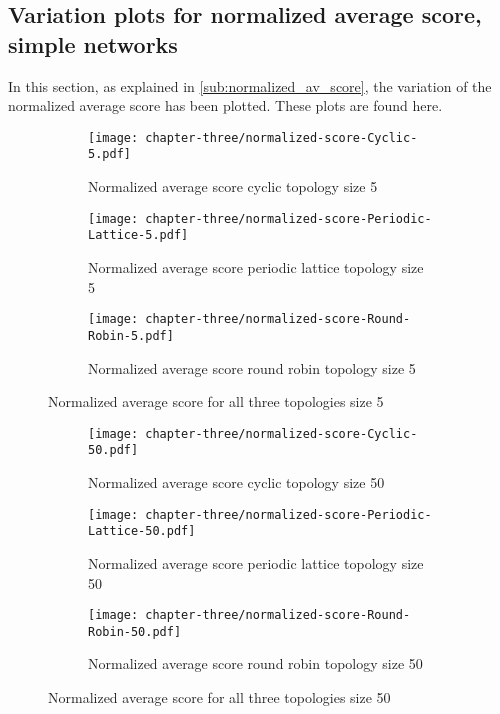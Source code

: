\subsection{Variation plots for normalized average score, simple networks}
\label{append:variation-plots}
In this section, as explained in \autoref{sub:normalized_av_score}, the variation of the
normalized average score has been plotted. These plots are found here.

\begin{figure}[H]
	\centering
	\begin{subfigure}[t]{0.75\textwidth}
		\centering
		\texttt{[image: chapter-three/normalized-score-Cyclic-5.pdf]}
		\caption{Normalized average score cyclic topology size 5}
	\end{subfigure}
	\hfill
	\begin{subfigure}[t]{0.75\textwidth}\centering
		\centering
		\texttt{[image: chapter-three/normalized-score-Periodic-Lattice-5.pdf]}
		\caption{Normalized average score periodic lattice topology size 5}
	\end{subfigure}
	\hfill
	\begin{subfigure}[t]{0.75\textwidth}\centering
		\centering
		\texttt{[image: chapter-three/normalized-score-Round-Robin-5.pdf]}
		\caption{Normalized average score round robin topology size 5}
	\end{subfigure}
	\caption{Normalized average score for all three topologies size 5}
	\label{fig:average-score-five}
\end{figure}

\begin{figure}[H]
	\centering
	\begin{subfigure}[t]{0.75\textwidth}
		\centering
		\texttt{[image: chapter-three/normalized-score-Cyclic-50.pdf]}
		\caption{Normalized average score cyclic topology size 50}
	\end{subfigure}
	\hfill
	\begin{subfigure}[t]{0.75\textwidth}\centering
		\centering
		\texttt{[image: chapter-three/normalized-score-Periodic-Lattice-50.pdf]}
		\caption{Normalized average score periodic lattice topology size 50}
	\end{subfigure}
	\hfill
	\begin{subfigure}[t]{0.75\textwidth}\centering
		\centering
		\texttt{[image: chapter-three/normalized-score-Round-Robin-50.pdf]}
		\caption{Normalized average score round robin topology size 50}
	\end{subfigure}
	\caption{Normalized average score for all three topologies size 50}
	\label{fig:average-score-fifty}
\end{figure}

